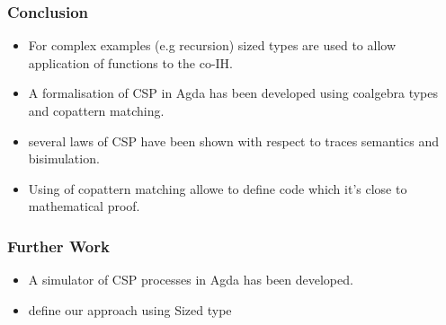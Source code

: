 \documentclass{beamer}
\begin{document}
%
%
%
%
%
%
%
%
%






\begin{frame}
\frametitle{Conclusion}
\begin{itemize}

\item For complex examples (e.g recursion) sized types are used to allow application of functions to the co-IH.

\item  A formalisation of CSP in Agda has been developed using coalgebra types and copattern matching.
\item  several laws of CSP have been shown with respect to traces semantics and bisimulation.  
\item Using of copattern matching allowe to define code which it's close to mathematical proof.

\end{itemize}
\end{frame}



\begin{frame}[fragile] 
\frametitle{Further Work }

\begin{itemize}
\item A simulator of CSP processes in Agda has been developed. 
\item define our approach using Sized type 
\end{itemize}

	

\end{frame}
\end{document}
